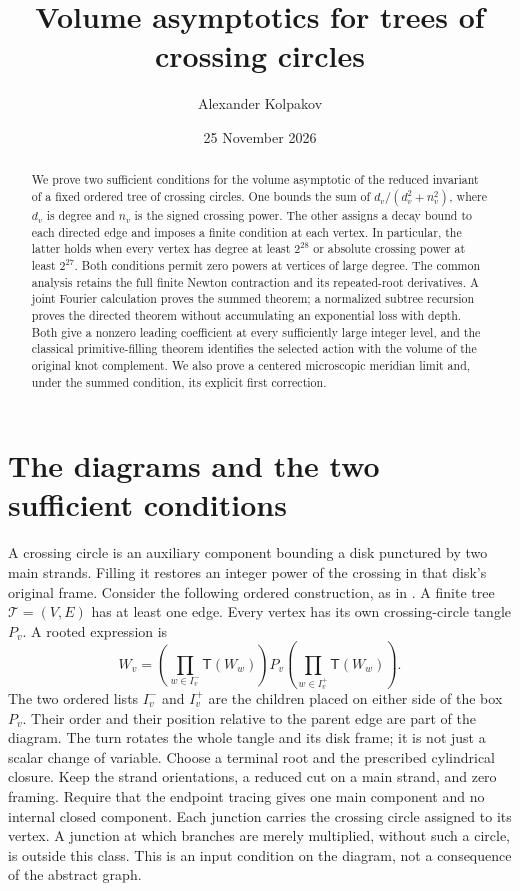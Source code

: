 \documentclass[11pt]{article}
\title{Volume asymptotics for trees of crossing circles}
\author{Alexander Kolpakov}\date{25 November 2026}
\numberwithin{equation}{section}
\theoremstyle{definition}\newtheorem{definition}[theorem]{Definition}
\theoremstyle{remark}\newtheorem{remark}[theorem]{Remark}
\newcommand{\Turn}{\mathsf T}
\begin{document}
\maketitle
\begin{abstract}
We prove two sufficient conditions for the volume asymptotic of the
reduced invariant of a fixed ordered tree of crossing circles. One
bounds the sum of \(d_v/(d_v^2+n_v^2)\), where \(d_v\) is degree and
\(n_v\) is the signed crossing power. The other assigns a decay bound
to each directed edge and imposes a finite condition at each vertex.
In particular, the latter holds when every vertex has degree at least
\(2^{28}\) or absolute crossing power at least \(2^{27}\). Both conditions
permit zero powers at vertices of large degree. The common analysis
retains the full finite Newton contraction and its repeated-root
derivatives. A joint Fourier calculation proves the summed theorem;
a normalized subtree recursion proves the directed theorem without
accumulating an exponential loss with depth. Both give a nonzero
leading coefficient at every sufficiently large integer level, and
the classical primitive-filling theorem identifies the selected action
with the volume of the original knot complement. We also prove a
centered microscopic meridian limit and, under the summed condition,
its explicit first correction.
\end{abstract}

\section{The diagrams and the two sufficient conditions}\label{cta:intro}\label{dt:intro}

A crossing circle is an auxiliary component bounding a disk punctured
by two main strands. Filling it restores an integer power of the
crossing in that disk's original frame. Consider the following
ordered construction, as in \cite[Section~1]{Geometry}. A finite tree
\(\mathcal T=(V,E)\) has at least one edge. Every vertex has its own
crossing-circle tangle \(P_v\). A rooted expression is
\begin{equation}\label{cta:word}
 W_v=\left(\prod_{w\in I_v^-}\Turn(W_w)\right)P_v
             \left(\prod_{w\in I_v^+}\Turn(W_w)\right).
\end{equation}
The two ordered lists $I_v^-$ and $I_v^+$ are the children placed
on either side of the box $P_v$. Their order and their position
relative to the parent edge are part of the diagram. The turn rotates the whole
tangle and its disk frame; it is not just a scalar change of variable.
Choose a terminal root and the prescribed cylindrical closure. Keep
the strand orientations, a reduced cut on a main strand, and
zero framing. Require that the endpoint tracing gives one main
component and no internal closed component. Each junction carries the crossing circle assigned to its vertex.
A junction at which branches are merely multiplied, without such a
circle, is outside this class. This is an input condition on the diagram, not a consequence
of the abstract graph.
\end{document}
